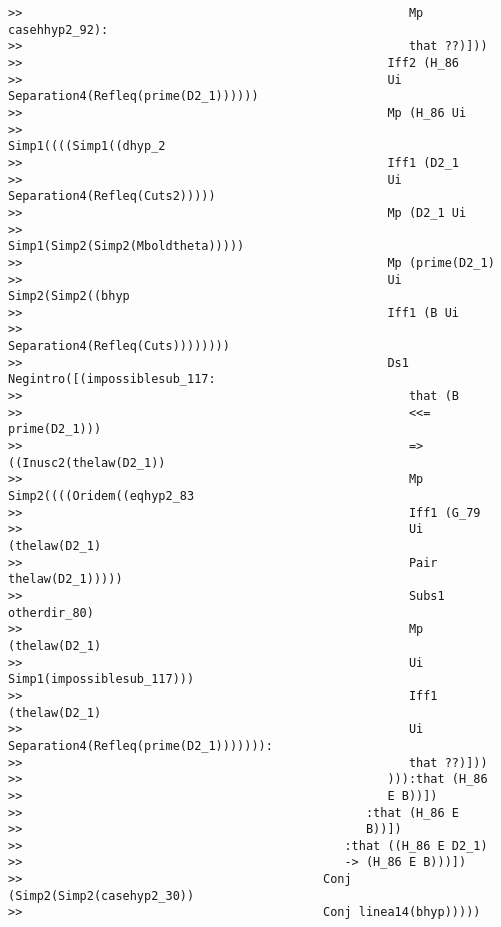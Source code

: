\documentclass[12pt]{article}
\begin{document}
\begin{verbatim}
>>                                                      Mp casehhyp2_92):
>>                                                      that ??)]))
>>                                                   Iff2 (H_86
>>                                                   Ui Separation4(Refleq(prime(D2_1))))))
>>                                                   Mp (H_86 Ui
>>                                                   Simp1((((Simp1((dhyp_2
>>                                                   Iff1 (D2_1
>>                                                   Ui Separation4(Refleq(Cuts2)))))
>>                                                   Mp (D2_1 Ui
>>                                                   Simp1(Simp2(Simp2(Mboldtheta)))))
>>                                                   Mp (prime(D2_1)
>>                                                   Ui Simp2(Simp2((bhyp
>>                                                   Iff1 (B Ui
>>                                                   Separation4(Refleq(Cuts))))))))
>>                                                   Ds1 Negintro([(impossiblesub_117:
>>                                                      that (B
>>                                                      <<= prime(D2_1)))
>>                                                      => ((Inusc2(thelaw(D2_1))
>>                                                      Mp Simp2((((Oridem((eqhyp2_83
>>                                                      Iff1 (G_79
>>                                                      Ui (thelaw(D2_1)
>>                                                      Pair thelaw(D2_1)))))
>>                                                      Subs1 otherdir_80)
>>                                                      Mp (thelaw(D2_1)
>>                                                      Ui Simp1(impossiblesub_117)))
>>                                                      Iff1 (thelaw(D2_1)
>>                                                      Ui Separation4(Refleq(prime(D2_1))))))):
>>                                                      that ??)]))
>>                                                   ))):that (H_86
>>                                                   E B))])
>>                                                :that (H_86 E
>>                                                B))])
>>                                             :that ((H_86 E D2_1)
>>                                             -> (H_86 E B)))])
>>                                          Conj (Simp2(Simp2(casehyp2_30))
>>                                          Conj linea14(bhyp)))))

\end{verbatim}
\end{document}
